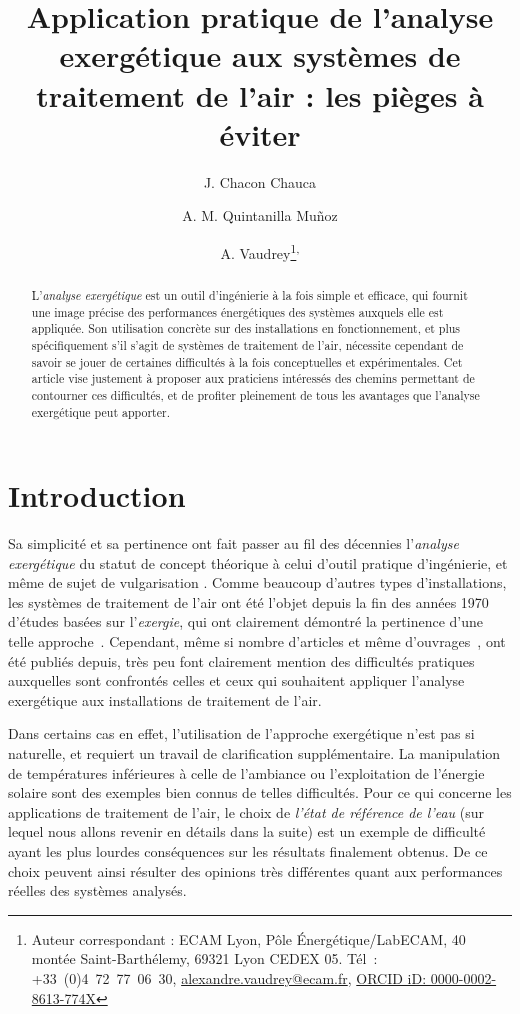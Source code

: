 \documentclass[a4paper,11pt]{scrartcl}
\title{Application pratique de l'analyse exergétique aux systèmes de traitement
de l'air : les pièges à éviter}
\author[1,2]{J. Chacon Chauca}
\author[3]{A. M. Quintanilla Muñoz}
\author[1,2]{A. Vaudrey\thanks{Auteur correspondant : ECAM Lyon, Pôle Énergétique/LabECAM, 40 montée Saint-Barthélemy, 69321 Lyon CEDEX 05. Tél : +33 (0)4 72 77 06 30, \href{mailto:alexandre.vaudrey@ecam.fr}{alexandre.vaudrey@ecam.fr}, \href{http://orcid.org/0000-0002-8613-774X}{ORCID iD: 0000-0002-8613-774X}}\textsuperscript{,}}
\affil[1]{Université de Lyon, ECAM Lyon, INSA-Lyon, LabECAM, F-69005, France.}
\affil[2]{Pontificia Universidad Cat\'olica del Per\'u (PUCP), Laboratorio
de Energ\'ia, Lima, Pérou.}
\affil[3]{Département Énergie, Institut FEMTO-ST, UMR 6174, CNRS, Université de Bourgogne Franche-Comté, Belfort, France.}
\begin{document}
\maketitle

\begin{abstract}
	L'\emph{analyse exergétique} est un outil d'ingénierie à la fois simple
	et efficace, qui fournit une image précise des performances énergétiques
	des systèmes auxquels elle est appliquée. Son utilisation concrète sur
	des installations en fonctionnement, et plus spécifiquement s'il s'agit de
	systèmes de traitement de l'air, nécessite cependant de savoir
	se jouer de certaines difficultés à la fois conceptuelles et
	expérimentales. Cet article vise justement à proposer aux praticiens
	intéressés des chemins permettant de contourner ces difficultés, et de
	profiter pleinement de tous les avantages que l'analyse exergétique peut
	apporter.
\end{abstract}

\tableofcontents

\section{Introduction}

Sa simplicité et sa pertinence ont fait passer au fil des décennies
l'\emph{analyse exergétique} du statut de concept théorique à celui d'outil
pratique d'ingénierie, et même de sujet de vulgarisation \cite{SV-2013}. Comme
beaucoup d'autres types d'installations, les systèmes de traitement de l'air ont
été l'objet depuis la fin des années 1970 d'études basées sur l'\emph{exergie},
qui ont clairement démontré la pertinence d'une telle
approche~\cite{Gaggioli-1978,ASHRAE-1979,ECM-021-0065}. Cependant, même si nombre d'articles et même d'ouvrages~\cite{Dincer-2015}, ont été publiés depuis, très peu font clairement mention des difficultés pratiques auxquelles sont confrontés
celles et ceux qui souhaitent appliquer l'analyse exergétique aux installations
de traitement de l'air.

Dans certains cas en effet, l'utilisation de l'approche exergétique n’est pas si
naturelle, et requiert un travail de clarification supplémentaire. La
manipulation de températures inférieures à celle de l’ambiance
\cite{RGT-035-0651} ou l’exploitation de l’énergie solaire \cite{EPL-104-40008}
sont des exemples bien connus de telles difficultés. Pour ce qui concerne les
applications de traitement de l’air, le choix de \emph{l’état de référence de
l’eau} (sur lequel nous allons revenir en détails dans la suite) est un exemple
de difficulté ayant les plus lourdes conséquences sur les résultats finalement
obtenus. De ce choix peuvent ainsi résulter des opinions très différentes quant
aux performances réelles des systèmes analysés. 
\end{document}
